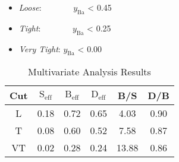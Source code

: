  \begin{itemize}  %
		\item \emph{Loose}: \ \ \ \ \ \ \ $y_{\text{Ba}}$ < 0.45
		\item \emph{Tight}:  \ \ \ \ \ \ \    $y_{\text{Ba}}$ < 0.25
		\item \emph{Very Tight}: $y_{\text{Ba}}$ < 0.00
        \end{itemize}



\begin{table}[ht]
\caption{Multivariate Analysis Results} %
\vspace{-5pt}
\centering %
\begin{tabular}{c c c c c c} %
\hline\hline %
Cut & $\text{S}_{\text{eff}}$ & $\text{B}_{\text{eff}}$ & $\text{D}_{\text{eff}}$ & B/S & D/B \\ [0.5ex] %
\hline %
L & 0.18 & 0.72 & 0.65 & 4.03 & 0.90  \\ %
T & 0.08 & 0.60 & 0.52 & 7.58 & 0.87 \\
VT & 0.02 & 0.28 & 0.24 & 13.88 & 0.86 \\ [1ex] %
\hline %
\end{tabular}
\label{table:nonlin} %
\end{table}
